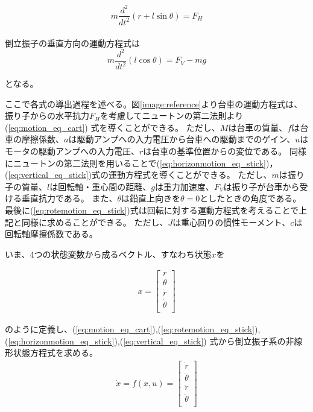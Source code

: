 	\begin{equation}
		m\frac{d^{2}}{dt^{2}}(r+l\sin\theta) = F_{H}
		\label{eq:horizonmotion_eq_stick}
	\end{equation}
	\\
	倒立振子の垂直方向の運動方程式は\\
	
	\begin{equation}
		m\frac{d^{2}}{dt^{2}}(l\cos\theta) = F_{V}-mg
		\label{eq:vertical_eq_stick}
	\end{equation}
	
	となる。
	\par
	ここで各式の導出過程を述べる。図\ref{image:reference}より台車の運動方程式は、振り子からの水平抗力$F_{H}$を考慮してニュートンの第二法則より(\ref{eq:motion_eq_cart})
	式を導くことができる。
	ただし、$M$は台車の質量、$f$は台車の摩擦係数、$a$は駆動アンプへの入力電圧から台車への駆動までのゲイン、$u$はモータの駆動アンプへの入力電圧、$r$は台車の基準位置からの変位である。
	同様にニュートンの第二法則を用いることで(\ref{eq:horizonmotion_eq_stick})，(\ref{eq:vertical_eq_stick})式の運動方程式を導くことができる。
	ただし、$m$は振り子の質量、$l$は回転軸・重心間の距離、$g$は重力加速度、$F_{V}$は振り子が台車から受ける垂直抗力である。
	また、$\theta$は鉛直上向きを$\theta=0$としたときの角度である。
	最後に(\ref{eq:rotemotion_eq_stick})式は回転に対する運動方程式を考えることで上記と同様に求めることができる。
	ただし、$J$は重心回りの慣性モーメント、$c$は回転軸摩擦係数である。
	\par
	いま、4つの状態変数から成るベクトル、すなわち状態$x$を
					
	\begin{eqnarray}
		x=\left[
		\begin{array}{ccc}
			r\\
			\theta\\
			\dot{r}\\
			\dot{\theta}\\
		\end{array}
		\right]
		\label{eq:array1}
	\end{eqnarray}
					
	のように定義し、(\ref{eq:motion_eq_cart}),(\ref{eq:rotemotion_eq_stick}),
	(\ref{eq:horizonmotion_eq_stick}),(\ref{eq:vertical_eq_stick})
	式から倒立振子系の非線形状態方程式を求める。
	\begin{eqnarray}
		\dot{x} = f(x,u) = \left[
		\begin{array}{ccc}
			\dot{r}\\
			\dot{\theta}\\
			\ddot{r}\\
			\ddot{\theta}\\
		\end{array}
		\right]
		\label{eq:array2}
	\end{eqnarray}
					
